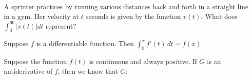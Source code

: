 \documentclass{ximera}
\newcommand{\recommendation}[1]{}
\newcommand{\GoodQuestions}[1]{}
\begin{document}



\begin{problem}
  \recommendation{Vic}
  \GoodQuestions{Subject: Evaluating definite integrals 1Q}
  
  A sprinter practices by running various distances back and forth in
  a straight line in a gym. Her velocity at $t$ seconds is given by
  the function $v(t)$. What does $\int_0^{60} |v(t)| dt$ represent?
  \begin{multipleChoice}
  \end{multipleChoice}
\end{problem}

\begin{problem}
  \recommendation{Vic}
  \GoodQuestions{Subject: Evaluating definite integrals 2P}

  Suppose $f$ is a differentiable function. Then $\int_0^{x} f'(t) \,
  dt = f(x)$
  \begin{multipleChoice}
  \end{multipleChoice}
\end{problem}

\begin{problem}
  \recommendation{Vic}
  \GoodQuestions{Subject: Evaluating definite integrals 5P}

  Suppose the function $f(t)$ is continuous and always positive. If
  $G$ is an antiderivative of $f$, then we know that $G$:
  \begin{multipleChoice}
  \end{multipleChoice}
\end{problem}




\end{document}
